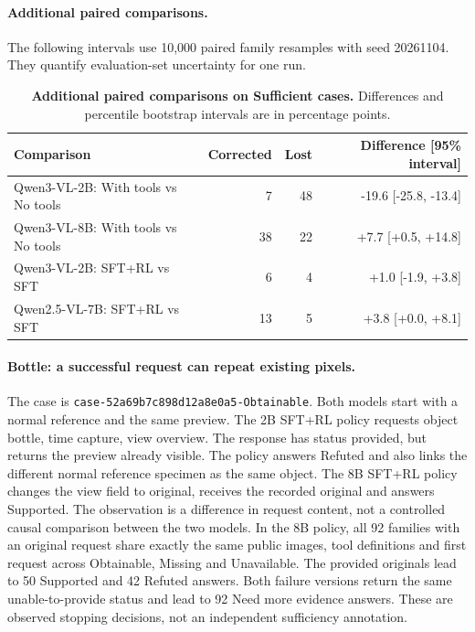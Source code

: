 \paragraph{Additional paired comparisons.}
The following intervals use 10,000 paired family resamples with seed 20261104.
They quantify evaluation-set uncertainty for one run.
\begin{table}[t]\centering\small

\caption{\textbf{Additional paired comparisons on Sufficient cases.} Differences and percentile bootstrap intervals are in percentage points.}

\begin{tabular}{@{}lrrr@{}}\toprule

Comparison & Corrected & Lost & Difference [95\% interval]\\\midrule

Qwen3-VL-2B: With tools vs No tools & 7 & 48 & -19.6 [-25.8, -13.4]\\

Qwen3-VL-8B: With tools vs No tools & 38 & 22 & +7.7 [+0.5, +14.8]\\

Qwen3-VL-2B: SFT+RL vs SFT & 6 & 4 & +1.0 [-1.9, +3.8]\\

Qwen2.5-VL-7B: SFT+RL vs SFT & 13 & 5 & +3.8 [+0.0, +8.1]\\

\bottomrule\end{tabular}\end{table}

\paragraph{Bottle: a successful request can repeat existing pixels.}

The case is \texttt{case-52a69b7c898d12a8e0a5-Obtainable}. Both models start with a normal reference and the same preview. The 2B SFT+RL policy requests object bottle, time capture, view overview. The response has status provided, but returns the preview already visible. The policy answers Refuted and also links the different normal reference specimen as the same object. The 8B SFT+RL policy changes the view field to original, receives the recorded original and answers Supported. The observation is a difference in request content, not a controlled causal comparison between the two models. In the 8B policy, all 92 families with an original request share exactly the same public images, tool definitions and first request across Obtainable, Missing and Unavailable. The provided originals lead to 50 Supported and 42 Refuted answers. Both failure versions return the same unable-to-provide status and lead to 92 Need more evidence answers. These are observed stopping decisions, not an independent sufficiency annotation.
